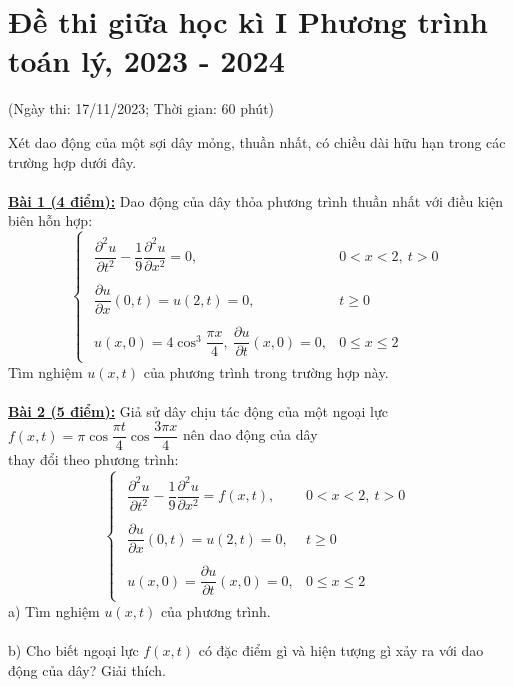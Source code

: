 \documentclass[10.5pt, a4paper]{article}
\begin{document}
\section{Đề thi giữa học kì I Phương trình toán lý, 2023 - 2024}
\begin{center}
	\color{blue}(Ngày thi: 17/11/2023; Thời gian: 60 phút)
\end{center}
Xét dao động của một sợi dây mỏng, thuần nhất, có chiều dài hữu hạn trong các trường hợp dưới đây.\\\\
\color{red}\underline{\textbf{Bài 1 (4 điểm):}} \color{black}Dao động của dây thỏa phương trình thuần nhất với điều kiện biên hỗn hợp: $$\begin{cases}
\begin{array}{ll}
\dfrac{\partial^2u}{\partial t^2}-\dfrac19\dfrac{\partial^2u}{\partial x^2}=0, & 0<x<2,~t>0\\\\
\dfrac{\partial u}{\partial x}(0,t)=u(2,t)=0, & t\ge0\\\\
u(x,0)=4\cos^3\dfrac{\pi x}{4},~\dfrac{\partial u}{\partial t}(x,0)=0, & 0\le x\le2
\end{array}
\end{cases}$$
Tìm nghiệm $u(x,t)$ của phương trình trong trường hợp này.\\\\
\color{red}\underline{\textbf{Bài 2 (5 điểm):}} \color{black}Giả sử dây chịu tác động của một ngoại lực $f(x,t)=\pi\cos\dfrac{\pi t}{4}\cos\dfrac{3\pi x}{4}$ nên dao động của dây\\ thay đổi theo phương trình: $$\begin{cases}
\begin{array}{ll}
\dfrac{\partial^2u}{\partial t^2}-\dfrac19\dfrac{\partial^2u}{\partial x^2}=f(x,t), & 0<x<2,~t>0\\\\
\dfrac{\partial u}{\partial x}(0,t)=u(2,t)=0, & t\ge0\\\\
u(x,0)=\dfrac{\partial u}{\partial t}(x,0)=0, & 0\le x\le2
\end{array}
\end{cases}$$
\color{red}a) \color{black}Tìm nghiệm $u(x,t)$ của phương trình.\\\\
\color{red}b) \color{black}Cho biết ngoại lực $f(x,t)$ có đặc điểm gì và hiện tượng gì xảy ra với dao động của dây? Giải thích.\\\\
\end{document}
